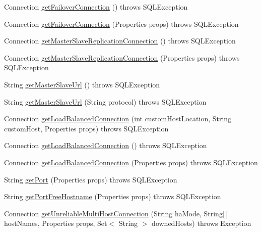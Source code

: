 \begin{DoxyCompactItemize}
\item 
Connection \mbox{\hyperlink{classtestsuite_1_1_base_test_case_aa0bd46e11f461b964afb1a93a6e5aa15}{get\+Failover\+Connection}} ()  throws S\+Q\+L\+Exception 
\item 
Connection \mbox{\hyperlink{classtestsuite_1_1_base_test_case_a7b89fc31036d3e6e4903f21c98477de4}{get\+Failover\+Connection}} (Properties props)  throws S\+Q\+L\+Exception 
\item 
Connection \mbox{\hyperlink{classtestsuite_1_1_base_test_case_a3ca1d1435694c5409c44d10e68800ccd}{get\+Master\+Slave\+Replication\+Connection}} ()  throws S\+Q\+L\+Exception 
\item 
Connection \mbox{\hyperlink{classtestsuite_1_1_base_test_case_aafbc4ce5f24d35545475dfe8ccd213f1}{get\+Master\+Slave\+Replication\+Connection}} (Properties props)  throws S\+Q\+L\+Exception 
\item 
String \mbox{\hyperlink{classtestsuite_1_1_base_test_case_ae368e9f56d2795da57e928cba4528ebb}{get\+Master\+Slave\+Url}} ()  throws S\+Q\+L\+Exception 
\item 
String \mbox{\hyperlink{classtestsuite_1_1_base_test_case_a1086920faaf5ad5271dd4cbf1cc92b75}{get\+Master\+Slave\+Url}} (String protocol)  throws S\+Q\+L\+Exception 
\item 
Connection \mbox{\hyperlink{classtestsuite_1_1_base_test_case_ad6cc6fb4e11a39397721138337a9a099}{get\+Load\+Balanced\+Connection}} (int custom\+Host\+Location, String custom\+Host, Properties props)  throws S\+Q\+L\+Exception 
\item 
Connection \mbox{\hyperlink{classtestsuite_1_1_base_test_case_aab97786f4a33c78651b4bae1898c9839}{get\+Load\+Balanced\+Connection}} ()  throws S\+Q\+L\+Exception 
\item 
Connection \mbox{\hyperlink{classtestsuite_1_1_base_test_case_add047612e662b6cc0f4798f7a196050b}{get\+Load\+Balanced\+Connection}} (Properties props)  throws S\+Q\+L\+Exception 
\item 
String \mbox{\hyperlink{classtestsuite_1_1_base_test_case_ac94c63cb4d1c0bd766ddc811ff3aa5ca}{get\+Port}} (Properties props)  throws S\+Q\+L\+Exception 
\item 
String \mbox{\hyperlink{classtestsuite_1_1_base_test_case_ac54f35a44d1d5e6dc4d41cf6b06cea83}{get\+Port\+Free\+Hostname}} (Properties props)  throws S\+Q\+L\+Exception 
\item 
Connection \mbox{\hyperlink{classtestsuite_1_1_base_test_case_af5d756474dc2a76bef281fc884529658}{get\+Unreliable\+Multi\+Host\+Connection}} (String ha\+Mode, String\mbox{[}$\,$\mbox{]} host\+Names, Properties props, Set$<$ String $>$ downed\+Hosts)  throws Exception 

\end{DoxyCompactItemize}
